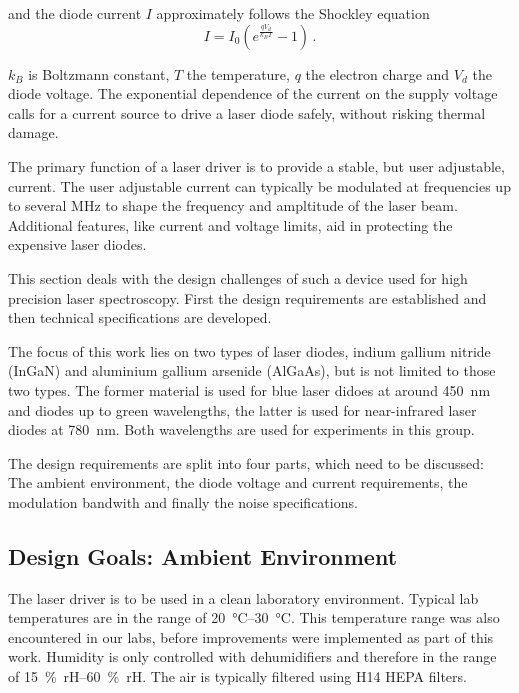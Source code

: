 and the diode current $I$ approximately follows the Shockley equation \cite{shockley_diode}
\begin{equation}
    I = I_0 \left( e^{\frac{qV_d}{k_B T}} - 1\right) \, . \label{eqn:shockley}
\end{equation}

$k_B$ is Boltzmann constant, $T$ the temperature, $q$ the electron charge and $V_d$ the diode voltage. The exponential dependence of the current on the supply voltage calls for a current source to drive a laser diode safely, without risking thermal damage.

The primary function of a laser driver is to provide a stable, but user adjustable, current. The user adjustable current can typically be modulated at frequencies up to several \unit{\MHz} to shape the frequency and ampltitude of the laser beam. Additional features, like current and voltage limits, aid in protecting the expensive laser diodes.

This section deals with the design challenges of such a device used for high precision laser spectroscopy. First the design requirements are established and then technical specifications are developed.

The focus of this work lies on two types of laser diodes, indium gallium nitride (InGaN) and aluminium gallium arsenide (AlGaAs), but is not limited to those two types. The former material is used for blue laser didoes at around \qty{450}{\nm} and diodes up to green wavelengths, the latter is used for near-infrared laser diodes at \qty{780}{\nm}. Both wavelengths are used for experiments in this group.

The design requirements are split into four parts, which need to be discussed: The ambient environment, the diode voltage and current requirements, the modulation bandwith and finally the noise specifications.

\clearpage
\subsection{Design Goals: Ambient Environment}%
\label{sec:design_goal_environment}
The laser driver is to be used in a clean laboratory environment. Typical lab temperatures are in the range of \qtyrange[range-phrase=\textup{ to }]{20}{30}{\celsius}. This temperature range was also encountered in our labs, before improvements were implemented as part of this work. Humidity is only controlled with dehumidifiers and therefore in the range of \qtyrange{15}{60}{\percent rH}. The air is typically filtered using H14 HEPA filters.

